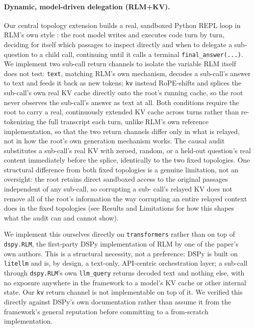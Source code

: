 \documentclass[11pt]{article}
\begin{document}
\paragraph{Dynamic, model-driven delegation (RLM+KV).} Our central
topology extension builds a real, sandboxed Python REPL loop in RLM's own
style \citep{rlm2026}: the root model writes and executes code turn by
turn, deciding for itself which passages to inspect directly and when to
delegate a sub-question to a child call, continuing until it calls a
terminal \texttt{final\_answer(...)}. We implement two sub-call return
channels to isolate the variable RLM itself does not test: \texttt{text},
matching RLM's own mechanism, decodes a sub-call's answer to text and
feeds it back as new tokens; \texttt{kv} instead RoPE-shifts and splices
the sub-call's own real KV cache directly onto the root's running cache,
so the root never observes the sub-call's answer as text at all. Both
conditions require the root to carry a real, continuously extended KV
cache across turns rather than re-tokenizing the full transcript each
turn, unlike RLM's own reference implementation, so that the two return
channels differ only in what is relayed, not in how the root's own
generation mechanism works. The causal audit substitutes a sub-call's
real KV with zeroed, random, or a held-out question's real content
immediately before the splice, identically to the two fixed topologies.
One structural difference from both fixed topologies is a genuine
limitation, not an oversight: the root retains direct sandboxed access to
the original passages independent of any sub-call, so corrupting a sub-
call's relayed KV does not remove all of the root's information the way
corrupting an entire relayed context does in the fixed topologies (see
Results and Limitations for how this shapes what the audit can and
cannot show).

We implement this ourselves directly on \texttt{transformers}
\citep{transformers2020} rather than on top of \texttt{dspy.RLM}, the
first-party DSPy implementation of RLM by one of the paper's own authors.
This is a structural necessity, not a preference: DSPy is built on
\texttt{litellm} and is, by design, a text-only, API-centric orchestration
layer; a sub-call through \texttt{dspy.RLM}'s own \texttt{llm\_query}
returns decoded text and nothing else, with no exposure anywhere in the
framework to a model's KV cache or other internal state. Our \texttt{kv}
return channel is not implementable on top of it. We verified this
directly against DSPy's own documentation rather than assume it from the
framework's general reputation before committing to a from-scratch
implementation.
\end{document}
